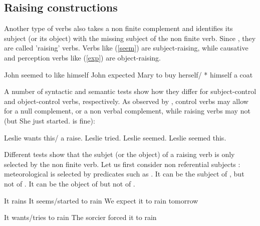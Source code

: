 \documentclass[output=paper]{langsci/langscibook}
\begin{document}
\subsection{Raising constructions}

Another type of verbs also takes a non finite complement and identifies its subject (or its object) with the missing subject of the non finite verb. Since \citet{Postal1974}, they are called 'raising' verbs. Verbs like  (\ref{seem}) are subject-raising, while
causative and perception verbs like  (\ref{exp}) are object-raising.
\begin{exe}
	\ex \begin{xlist}
	\ex John seemed to like himself \label{seem}
\ex  John expected Mary to buy herself/ * himself a coat \label{exp}
\end{xlist}
 \end{exe}
 
 A number of syntactic and semantic tests show how they differ for subject-control and object-control verbs, respectively. As observed by \citet{Jacobson1990}, control verbs may allow for a null complement, or a non verbal complement, while raising verbs may not (but She just started. is fine):


	\begin{exe}
	\ex \begin{xlist}
	\ex Leslie wants this/ a raise.
	\ex Leslie tried.
	\ex *Leslie seemed.
	\ex *Leslie seemed this.
	\end{xlist}
 \end{exe}
 
 Different tests show that the subjet (or the object) of a raising verb is only selected by the non finite verb. Let us first consider non referential subjects : meteorological  is selected by predicates such as . It can be the subject of , but not of . It can be the object of  but not of .
	
	\begin{exe}
	\ex \begin{xlist}
	\ex It rains
   \ex 	It seems/started to rain
  \ex We expect it to rain tomorrow
 \end{xlist}
\ex \begin{xlist}
   \ex 	*It wants/tries to rain
   \ex 	*The sorcier forced it to rain
 \end{xlist}
 	\end{exe}
 	
\end{document}

